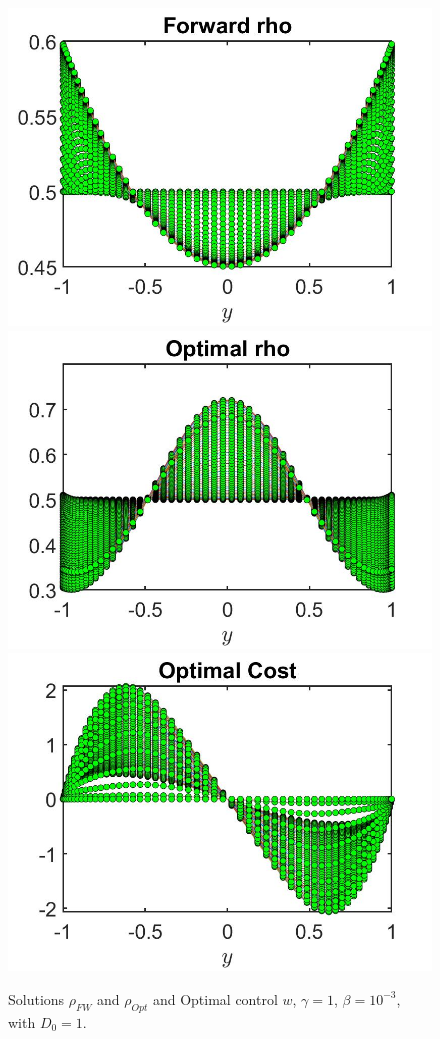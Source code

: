 \documentclass[11pt, a4paper]{article}
\theoremstyle{definition}
\begin{document}
\begin{figure}[h]
	\includegraphics[scale=0.3]{rhoFWM3.jpg}	\includegraphics[scale=0.3]{rhoOptM3.jpg}
	\includegraphics[scale=0.3]{wOptM3.jpg}
	\caption{Solutions $\rho_{FW}$ and $\rho_{Opt}$ and Optimal control $w$, $\gamma = 1$, $\beta = 10^{-3}$, with $D_0 = 1$.}
	\label{rhoM2}
\end{figure}
\end{document}
